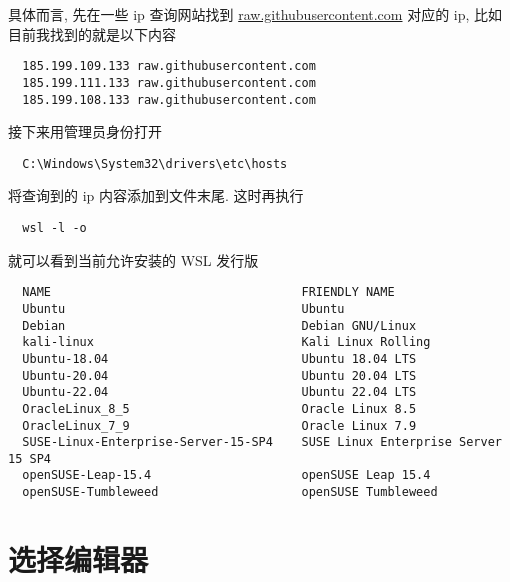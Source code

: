 \documentclass[fontset=founder]{ctexrep}
\begin{document}
具体而言,
先在一些 ip 查询网站找到 \url{raw.githubusercontent.com} 对应的 ip,
比如目前我找到的就是以下内容
\begin{lstlisting}
  185.199.109.133 raw.githubusercontent.com
  185.199.111.133 raw.githubusercontent.com
  185.199.108.133 raw.githubusercontent.com
\end{lstlisting}
接下来用管理员身份打开
\begin{lstlisting}
  C:\Windows\System32\drivers\etc\hosts
\end{lstlisting}
将查询到的 ip 内容添加到文件末尾.
这时再执行
\begin{lstlisting}
  wsl -l -o
\end{lstlisting}
就可以看到当前允许安装的 WSL 发行版
\begin{lstlisting}
  NAME                                   FRIENDLY NAME
  Ubuntu                                 Ubuntu
  Debian                                 Debian GNU/Linux
  kali-linux                             Kali Linux Rolling
  Ubuntu-18.04                           Ubuntu 18.04 LTS
  Ubuntu-20.04                           Ubuntu 20.04 LTS
  Ubuntu-22.04                           Ubuntu 22.04 LTS
  OracleLinux_8_5                        Oracle Linux 8.5
  OracleLinux_7_9                        Oracle Linux 7.9
  SUSE-Linux-Enterprise-Server-15-SP4    SUSE Linux Enterprise Server 15 SP4
  openSUSE-Leap-15.4                     openSUSE Leap 15.4
  openSUSE-Tumbleweed                    openSUSE Tumbleweed
\end{lstlisting}


\section{选择编辑器}
\end{document}
